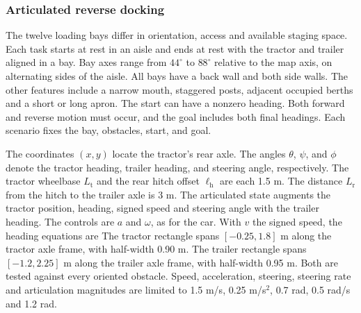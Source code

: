\subsubsection{Articulated reverse docking} The twelve loading bays differ in orientation, access and available staging space. Each task starts at rest in an aisle and ends at rest with the tractor and trailer aligned in a bay. Bay axes range from $44^\circ$ to $88^\circ$ relative to the map axis, on alternating sides of the aisle. All bays have a back wall and both side walls. The other features include a narrow mouth, staggered posts, adjacent occupied berths and a short or long apron. The start can have a nonzero heading. Both forward and reverse motion must occur, and the goal includes both final headings. Each scenario fixes the bay, obstacles, start, and goal.

The coordinates $(x,y)$ locate the tractor's rear axle. The angles $\theta$, $\psi$, and $\phi$ denote the tractor heading, trailer heading, and steering angle, respectively. The tractor wheelbase $L_{\mathrm t}$ and the rear hitch offset $\ell_{\mathrm h}$ are each 1.5 m. The distance $L_{\mathrm r}$ from the hitch to the trailer axle is 3 m. The articulated state augments the tractor position, heading, signed speed and steering angle with the trailer heading. The controls are $a$ and $\omega$, as for the car. With $v$ the signed speed, the heading equations are
The tractor rectangle spans $[-0.25,1.8]$ m along the tractor axle frame, with half-width 0.90 m. The trailer rectangle spans $[-1.2,2.25]$ m along the trailer axle frame, with half-width 0.95 m. Both are tested against every oriented obstacle. Speed, acceleration, steering, steering rate and articulation magnitudes are limited to 1.5 m/s, 0.25 m/s$^2$, 0.7 rad, 0.5 rad/s and 1.2 rad.

